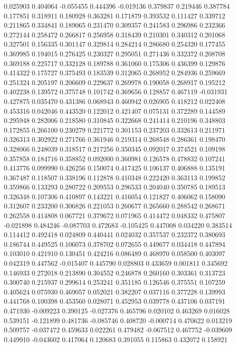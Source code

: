 0.025903
0.404064
-0.055455
0.444396
-0.019136
0.379837
0.219446
0.387784
0.177851
0.318911
0.180928
0.363281
0.171879
0.393532
0.111427
0.339712
0.211865
0.334841
0.189065
0.231470
0.309357
0.241583
0.296986
0.232366
0.272144
0.258472
0.266817
0.256958
0.318439
0.210301
0.340312
0.201068
0.327501
0.156335
0.301147
0.329814
0.284214
0.286680
0.254320
0.177455
0.369985
0.194015
0.276425
0.230327
0.295051
0.271436
0.332372
0.208708
0.369188
0.225717
0.332128
0.189788
0.361060
0.175306
0.436399
0.129876
0.414322
0.175727
0.375493
0.183539
0.312065
0.268952
0.284936
0.259669
0.251324
0.205197
0.206609
0.229637
0.269978
0.190058
0.268917
0.195212
0.402238
0.139572
0.375748
0.101742
0.369656
0.128857
0.467119
-0.031931
0.427875
0.035470
0.431386
0.068943
0.460942
0.026905
0.418212
0.022408
0.453316
0.042046
0.443520
0.122012
0.421407
0.075131
0.372289
0.144589
0.295948
0.282006
0.218580
0.310845
0.322668
0.241414
0.210196
0.348803
0.172855
0.266100
0.230279
0.221772
0.301153
0.237203
0.332613
0.211971
0.326313
0.302922
0.271766
0.361946
0.219314
0.268548
0.286361
0.198470
0.328066
0.248039
0.318517
0.217256
0.350345
0.092017
0.374521
0.109198
0.357858
0.184716
0.358852
0.092000
0.360981
0.126578
0.478832
0.107241
0.413776
0.099990
0.426256
0.150074
0.417425
0.106137
0.406888
0.135191
0.367487
0.118507
0.338196
0.112878
0.410348
0.222420
0.363113
0.199852
0.359866
0.133293
0.280722
0.209553
0.296533
0.204040
0.350785
0.189513
0.326348
0.107306
0.410897
0.143221
0.416054
0.121827
0.406062
0.158090
0.312607
0.233200
0.306826
0.221053
0.260677
0.265660
0.288542
0.268671
0.262558
0.414808
0.067721
0.379672
0.071965
0.414472
0.048332
0.475807
-0.021898
0.484246
-0.087703
0.472683
-0.105425
0.447008
0.034220
0.383514
0.114412
0.492418
0.024809
0.440441
0.024032
0.357537
0.232372
0.380693
0.186744
0.449525
0.106073
0.378702
0.072655
0.449677
0.034418
0.447894
0.103010
0.421910
0.130451
0.424216
0.086489
0.468970
0.058500
0.403097
0.042319
0.447562
-0.015407
0.445790
0.028803
0.433659
0.001811
0.345692
0.146933
0.272018
0.213890
0.304552
0.246878
0.260160
0.303361
0.313723
0.300740
0.215937
0.299614
0.253241
0.351185
0.126546
0.375551
0.107259
0.405624
0.075930
0.469057
0.052021
0.382207
0.037116
0.377228
0.139993
0.441768
0.100398
0.453560
0.028071
0.452953
0.039778
0.437106
0.037191
0.471930
-0.009223
0.390125
-0.027376
0.465796
0.020102
0.463269
0.016028
0.539151
-0.121899
0.481736
-0.085746
0.408720
-0.000714
0.470622
0.013219
0.509757
-0.037472
0.459633
0.022261
0.479482
-0.067512
0.467752
-0.039609
0.449910
-0.043602
0.417064
0.120683
0.391055
0.115863
0.432072
0.158921
